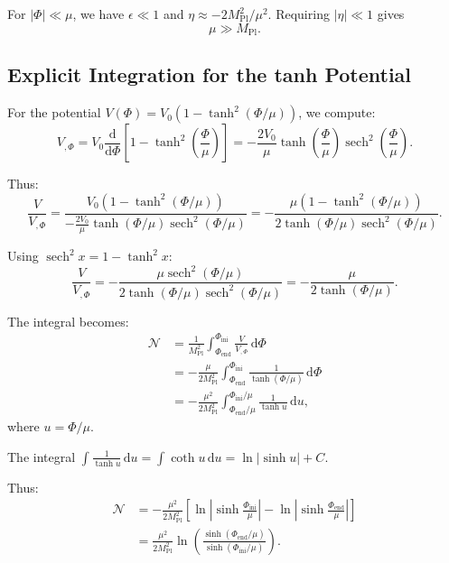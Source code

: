 \documentclass[11pt,a4paper]{article}
\numberwithin{equation}{section}
\theoremstyle{plain}
\theoremstyle{definition}
\theoremstyle{remark}
\newcommand{\dd}{\mathrm{d}}
\begin{document}
For $|\Phi| \ll \mu$, we have $\epsilon \ll 1$ and $\eta \approx -2M_{\mathrm{Pl}}^2/\mu^2$. Requiring $|\eta| \ll 1$ gives
\begin{equation}
\mu \gg M_{\mathrm{Pl}}.
\label{eq:mu-constraint}
\end{equation}

\subsection{Explicit Integration for the tanh Potential}

For the potential $V(\Phi) = V_0(1 - \tanh^2(\Phi/\mu))$, we compute:
\begin{equation}
V_{,\Phi} = V_0\frac{\dd}{\dd\Phi}\left[1 - \tanh^2\left(\frac{\Phi}{\mu}\right)\right] = -\frac{2V_0}{\mu}\tanh\left(\frac{\Phi}{\mu}\right)\operatorname{sech}^2\left(\frac{\Phi}{\mu}\right).
\end{equation}

Thus:
\begin{equation}
\frac{V}{V_{,\Phi}} = \frac{V_0(1-\tanh^2(\Phi/\mu))}{-\frac{2V_0}{\mu}\tanh(\Phi/\mu)\operatorname{sech}^2(\Phi/\mu)} = -\frac{\mu(1-\tanh^2(\Phi/\mu))}{2\tanh(\Phi/\mu)\operatorname{sech}^2(\Phi/\mu)}.
\end{equation}

Using $\operatorname{sech}^2 x = 1 - \tanh^2 x$:
\begin{equation}
\frac{V}{V_{,\Phi}} = -\frac{\mu\operatorname{sech}^2(\Phi/\mu)}{2\tanh(\Phi/\mu)\operatorname{sech}^2(\Phi/\mu)} = -\frac{\mu}{2\tanh(\Phi/\mu)}.
\end{equation}

The integral becomes:
\begin{align}
\mathcal{N} &= \frac{1}{M_{\mathrm{Pl}}^2}\int_{\Phi_{\mathrm{end}}}^{\Phi_{\mathrm{ini}}} \frac{V}{V_{,\Phi}}\,\dd\Phi\\
&= -\frac{\mu}{2M_{\mathrm{Pl}}^2}\int_{\Phi_{\mathrm{end}}}^{\Phi_{\mathrm{ini}}} \frac{1}{\tanh(\Phi/\mu)}\,\dd\Phi\\
&= -\frac{\mu^2}{2M_{\mathrm{Pl}}^2}\int_{\Phi_{\mathrm{end}}/\mu}^{\Phi_{\mathrm{ini}}/\mu} \frac{1}{\tanh u}\,\dd u,
\end{align}
where $u = \Phi/\mu$.

The integral $\int \frac{1}{\tanh u}\,\dd u = \int \coth u\,\dd u = \ln|\sinh u| + C$.

Thus:
\begin{align}
\mathcal{N} &= -\frac{\mu^2}{2M_{\mathrm{Pl}}^2}\left[\ln\left|\sinh\frac{\Phi_{\mathrm{ini}}}{\mu}\right| - \ln\left|\sinh\frac{\Phi_{\mathrm{end}}}{\mu}\right|\right]\\
&= \frac{\mu^2}{2M_{\mathrm{Pl}}^2}\ln\left(\frac{\sinh(\Phi_{\mathrm{end}}/\mu)}{\sinh(\Phi_{\mathrm{ini}}/\mu)}\right).
\label{eq:efolds-tanh-exact}
\end{align}
\end{document}
